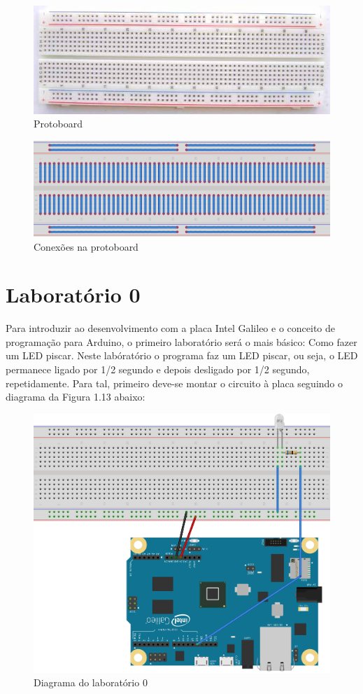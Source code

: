 \begin{figure}[h]
\centering
\includegraphics[scale=0.6]{chapter1/protoboard.jpg}
\caption{Protoboard}
\label{fig:11}
\end{figure}
\begin{figure}[h]
\centering
\includegraphics[scale=0.8]{chapter1/conexoes.jpg}
\caption{Conexões na protoboard}
\label{fig:12}
\end{figure}


\section{Laboratório 0}
\label{sec:4}
Para introduzir ao desenvolvimento com a placa Intel Galileo e o conceito de programação para Arduino, o primeiro laboratório será o mais básico: Como fazer um LED piscar. Neste labóratório o programa faz um LED piscar, ou seja, o LED permanece ligado por 1/2 segundo e depois desligado por 1/2 segundo, repetidamente. Para tal, primeiro deve-se montar o circuito à placa seguindo o diagrama da Figura 1.13 abaixo:
\begin{figure}[h]
\centering
\includegraphics[scale=0.7]{chapter1/blink.jpg}
\caption{Diagrama do laboratório 0}
\label{fig:13}
\end{figure}

